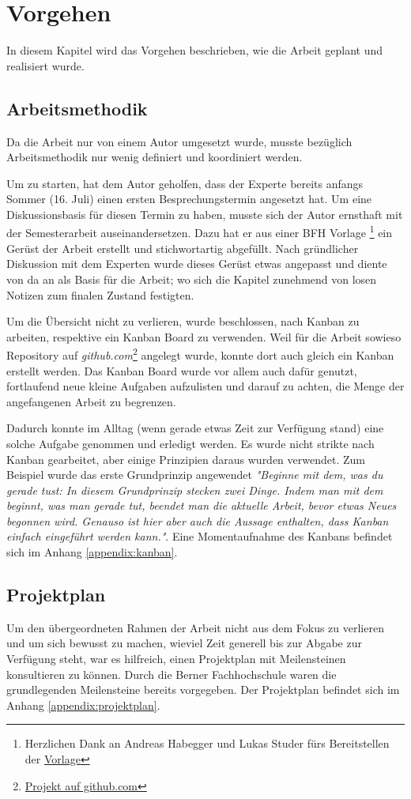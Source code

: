 \section{Vorgehen}
In diesem Kapitel wird das Vorgehen beschrieben, wie die Arbeit geplant und realisiert wurde.

\subsection{Arbeitsmethodik}
Da die Arbeit nur von einem Autor umgesetzt wurde, musste bezüglich Arbeitsmethodik nur wenig definiert und koordiniert werden.

Um zu starten, hat dem Autor geholfen, dass der Experte \prof\space bereits anfangs Sommer (16. Juli) einen ersten Besprechungstermin angesetzt hat. Um eine Diskussionsbasis für diesen Termin zu haben, musste sich der Autor ernsthaft mit der Semesterarbeit auseinandersetzen. Dazu hat er aus einer BFH Vorlage \footnote{Herzlichen Dank an Andreas Habegger und Lukas Studer fürs Bereitstellen der \href{https://gitlab.ti.bfh.ch/latex-utils/tpl_latex-thesis}{Vorlage}} ein Gerüst der Arbeit erstellt und stichwortartig abgefüllt. Nach gründlicher Diskussion mit dem Experten wurde dieses Gerüst etwas angepasst und diente von da an als Basis für die Arbeit; wo sich die Kapitel zunehmend von losen Notizen zum finalen Zustand festigten.

Um die Übersicht nicht zu verlieren, wurde beschlossen, nach Kanban zu arbeiten, respektive ein Kanban Board zu verwenden. Weil für die Arbeit sowieso Repository auf \emph{github.com}\footnote{\href{https://github.com/bfh-semesterarbeit/spot-geoprocessing/projects/1}{Projekt auf github.com}} angelegt wurde, konnte dort auch gleich ein Kanban erstellt werden. Das Kanban Board wurde vor allem auch dafür genutzt, fortlaufend neue kleine Aufgaben aufzulisten und darauf zu achten, die Menge der angefangenen Arbeit zu begrenzen.

Dadurch konnte im Alltag (wenn gerade etwas Zeit zur Verfügung stand) eine solche Aufgabe genommen und erledigt werden. Es wurde nicht strikte nach Kanban gearbeitet, aber einige Prinzipien daraus wurden verwendet. Zum Beispiel wurde das erste Grundprinzip angewendet \textit{"Beginne mit dem, was du gerade tust:
In diesem Grundprinzip stecken zwei Dinge. Indem man mit dem beginnt, was man gerade tut, beendet man die aktuelle Arbeit, bevor etwas Neues begonnen wird. Genauso ist hier aber auch die Aussage enthalten, dass Kanban einfach eingeführt werden kann."}\cite{kanban2010}. Eine Momentaufnahme des Kanbans befindet sich im Anhang \ref{appendix:kanban}.

\subsection{Projektplan}\label{chap:projektplan}
Um den übergeordneten Rahmen der Arbeit nicht aus dem Fokus zu verlieren und um sich bewusst zu machen, wieviel Zeit generell bis zur Abgabe zur Verfügung steht, war es hilfreich, einen Projektplan mit Meilensteinen konsultieren zu können. Durch die Berner Fachhochschule waren die grundlegenden Meilensteine bereits vorgegeben. Der Projektplan befindet sich im Anhang \ref{appendix:projektplan}.